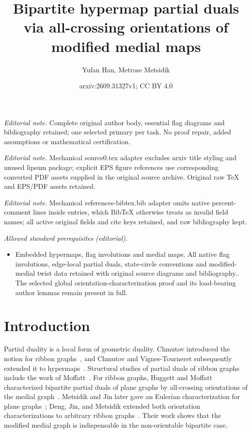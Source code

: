 \documentclass[10pt,a4paper]{article}
\title{Bipartite hypermap partial duals via all-crossing orientations of modified medial maps}
\author{Yufan Han, Metrose Metsidik}
\date{arxiv:2609.31327v1; CC BY 4.0}
\theoremstyle{definition}
\theoremstyle{remark}
\begin{document}
\maketitle
\noindent\textit{Editorial note.} Complete original author body, essential flag diagrams and bibliography retained; one selected primary per task. No proof repair, added assumptions or mathematical certification.\par\medskip
\noindent\textit{Editorial note.} Mechanical source0.tex adapter excludes arxiv title styling and unused lipsum package; explicit EPS figure references use corresponding converted PDF assets supplied in the original source archive. Original raw TeX and EPS/PDF assets retained.\par\medskip
\noindent\textit{Editorial note.} Mechanical references-bibtex.bib adapter omits native percent-comment lines inside entries, which BibTeX otherwise treats as invalid field names; all active original fields and cite keys retained, and raw bibliography kept.\par\medskip
\noindent\textit{Allowed standard prerequisites (editorial).}\begin{itemize}
\item Embedded hypermaps, flag involutions and medial maps. All native flag involutions, edge-local partial duals, state-circle conventions and modified-medial twist data retained with original source diagrams and bibliography.. The selected global orientation-characterization proof and its load-bearing author lemmas remain present in full.
\end{itemize}\medskip
\section{Introduction}

Partial duality is a local form of geometric duality. Chmutov introduced the notion for ribbon graphs~\cite{Chmutov2009}, and Chmutov and Vignes-Tourneret subsequently extended it to hypermaps~\cite{ChmutovVignes2022}. Structural studies of partial duals of ribbon graphs include the work of Moffatt~\cite{Moffatt2011,Moffatt2013}. For ribbon graphs, Huggett and Moffatt characterized bipartite partial duals of plane graphs by all-crossing orientations of the medial graph~\cite{HuggettMoffatt2013}. Metsidik and Jin later gave an Eulerian characterization for plane graphs~\cite{MetsidikJin2018}; Deng, Jin, and Metsidik extended both orientation characterizations to arbitrary ribbon graphs~\cite{DengJinMetsidik2020}. Their work shows that the modified medial graph is indispensable in the non-orientable bipartite case.
\end{document}
